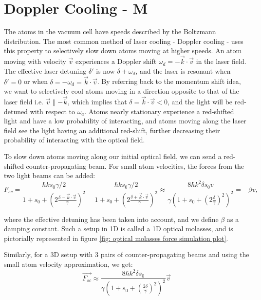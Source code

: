 \documentclass[12pt,twoside]{article}
\begin{document}
\section{Doppler Cooling - M}
The atoms in the vacuum cell have speeds described by the Boltzmann distribution. The most common method of laser cooling - Doppler cooling - uses this property to selectively slow down atoms moving at higher speeds. An atom moving with velocity $\vec{v}$ experiences a Doppler shift $\omega_d = -\vec{k} \cdot \vec{v}$ in the laser field. The effective laser detuning $\delta'$ is now $\delta + \omega_d$, and the laser is resonant when $\delta' = 0$ or when $\delta = -\omega_d = \vec{k} \cdot \vec{v}$. By referring back to the momentum shift idea, we want to selectively cool atoms moving in a direction opposite to that of the laser field i.e. $\vec{v} \parallel -\vec{k}$, which implies that $\delta = \vec{k} \cdot \vec{v} < 0$, and the light will be red-detuned with respect to $\omega_a$. Atoms nearly stationary experience a red-shifted light and have a low probability of interacting, and atoms moving along the laser field see the light having an additional red-shift, further decreasing their probability of interacting with the optical field.

To slow down atoms moving along our initial optical field, we can send a red-shifted counter-propagating beam. For small atom velocities, the forces from the two light beams can be added:
\begin{equation}
    F_{sc} = \frac{\hbar k s_0 \gamma / 2}{1 + s_0 + (2\frac{\delta - \vec{k} \cdot \vec{v}} {\gamma})^2} -  \frac{\hbar k s_0 \gamma / 2}{1 + s_0 + (2\frac{\delta + \vec{k} \cdot \vec{v}} {\gamma})^2}
    \approx \frac{8 \hbar k^2 \delta s_0 v}{\gamma (1 + s_0 + (2\frac{\delta}{\gamma})^2)^2} 
    = - \beta v,
\label{eqn: scattering force 2 beams}
\end{equation}

where the effective detuning has been taken into account, and we define $\beta$ as a damping constant. Such a setup in 1D is called a 1D optical molasses, and is pictorially represented in figure \ref{fig: optical molasses force simulation plot}.

Similarly, for a 3D setup with 3 pairs of counter-propagating beams and using the small atom velocity approximation, we get:
\begin{equation}
    \vec{F_{sc}} \approx \frac{8 \hbar k^2 \delta s_0}{\gamma (1 + s_0 + (\frac{2\delta}{\gamma})^2)^2} \vec{v}
\label{eqn: scattering force 6 beams}
\end{equation}
\end{document}
